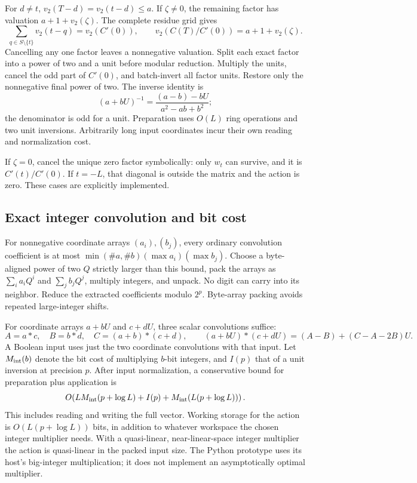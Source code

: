 For $d\ne t$, $v_2(T-d)=v_2(t-d)\le a$. If $\zeta\ne0$, the remaining
factor has valuation $a+1+v_2(\zeta)$. The complete residue grid gives
\[
 \sum_{q\in S\setminus\{t\}}v_2(t-q)=v_2(C'(0)),\qquad
 v_2(C(T)/C'(0))=a+1+v_2(\zeta).
\]
Cancelling any one factor leaves a nonnegative valuation. Split each exact
factor into a power of two and a unit before modular reduction. Multiply
the units, cancel the odd part of $C'(0)$, and batch-invert all factor units.
Restore only the nonnegative final power of two. The inverse identity is
\[
 (a+bU)^{-1}=\frac{(a-b)-bU}{a^2-ab+b^2};
\]
the denominator is odd for a unit. Preparation uses $O(L)$ ring operations
and two unit inversions. Arbitrarily long input coordinates incur their
own reading and normalization cost.

If $\zeta=0$, cancel the unique zero factor symbolically: only $w_t$ can
survive, and it is $C'(t)/C'(0)$. If $t=-L$, that diagonal is outside the
matrix and the action is zero. These cases are explicitly implemented.

\subsection{Exact integer convolution and bit cost}
For nonnegative coordinate arrays $(a_i),(b_j)$, every ordinary convolution
coefficient is at most $\min(\#a,\#b)(\max a_i)(\max b_j)$. Choose a
byte-aligned power of two $Q$ strictly larger than this bound, pack the
arrays as $\sum_i a_iQ^i$ and $\sum_jb_jQ^j$, multiply integers, and unpack.
No digit can carry into its neighbor. Reduce the extracted coefficients
modulo $2^p$. Byte-array packing avoids repeated large-integer shifts.

For coordinate arrays $a+bU$ and $c+dU$, three scalar convolutions suffice:
\[
 A=a*c,\quad B=b*d,\quad C=(a+b)*(c+d),\qquad
 (a+bU)*(c+dU)=(A-B)+(C-A-2B)U.
\]
A Boolean input uses just the two coordinate convolutions with that input.
Let $M_{\rm int}(b)$ denote the bit cost of multiplying $b$-bit integers,
and $I(p)$ that of a unit inversion at precision $p$. After input
normalization, a conservative bound for preparation plus application is
\begin{equation}
 O\!\left(LM_{\rm int}(p+\log L)+I(p)
              +M_{\rm int}(L(p+\log L))\right).\label{eq:kernel-cost}
\end{equation}
This includes reading and writing the full vector. Working storage for
the action is $O(L(p+\log L))$ bits, in addition to whatever workspace the
chosen integer multiplier needs. With a quasi-linear, near-linear-space
integer multiplier the action is quasi-linear in the packed input size.
The Python prototype uses its host's big-integer multiplication; it does
not implement an asymptotically optimal multiplier.

